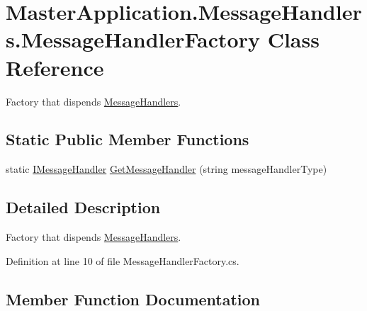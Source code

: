 \hypertarget{class_master_application_1_1_message_handlers_1_1_message_handler_factory}{}\section{Master\+Application.\+Message\+Handlers.\+Message\+Handler\+Factory Class Reference}
\label{class_master_application_1_1_message_handlers_1_1_message_handler_factory}


Factory that dispends \mbox{\hyperlink{namespace_master_application_1_1_message_handlers}{Message\+Handlers}}.  


\subsection*{Static Public Member Functions}
\begin{DoxyCompactItemize}
\item 
static \mbox{\hyperlink{interface_master_application_1_1_message_handlers_1_1_i_message_handler}{I\+Message\+Handler}} \mbox{\hyperlink{class_master_application_1_1_message_handlers_1_1_message_handler_factory_ae762cfb189e1a529bc41c134dbb94b3f}{Get\+Message\+Handler}} (string message\+Handler\+Type)
\end{DoxyCompactItemize}


\subsection{Detailed Description}
Factory that dispends \mbox{\hyperlink{namespace_master_application_1_1_message_handlers}{Message\+Handlers}}. 

Definition at line 10 of file Message\+Handler\+Factory.\+cs.



\subsection{Member Function Documentation}
\mbox{\label{class_master_application_1_1_message_handlers_1_1_message_handler_factory_ae762cfb189e1a529bc41c134dbb94b3f}} 
